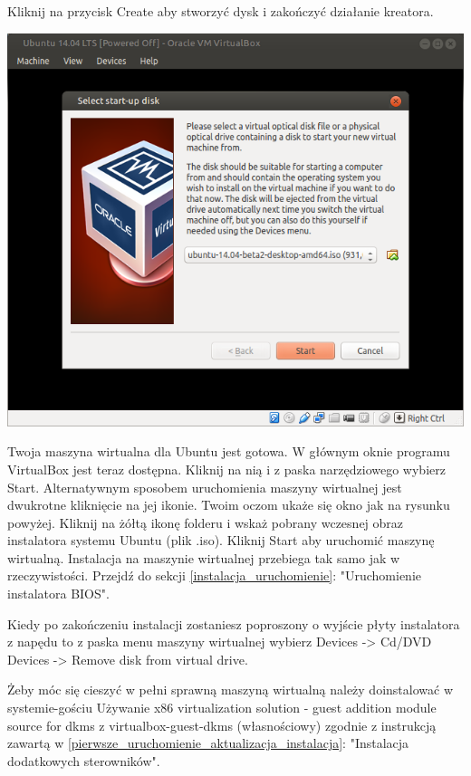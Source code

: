 Kliknij na przycisk \textcolor{ubuntu_orange}{Create} aby stworzyć dysk i zakończyć działanie kreatora.

\clearpage
\begin{center}
	\includegraphics[width=\linewidth]{images/virtualbox_start.png}
\end{center}

Twoja maszyna wirtualna dla Ubuntu jest gotowa. W głównym oknie programu VirtualBox jest teraz dostępna. Kliknij na nią i z paska narzędziowego wybierz \textcolor{ubuntu_orange}{Start}. Alternatywnym sposobem uruchomienia maszyny wirtualnej jest dwukrotne kliknięcie na jej ikonie. Twoim oczom ukaże się okno jak na rysunku powyżej. Kliknij na żółtą ikonę folderu i wskaż pobrany wczesnej obraz instalatora systemu Ubuntu (plik .iso). Kliknij \textcolor{ubuntu_orange}{Start} aby uruchomić maszynę wirtualną. Instalacja na maszynie wirtualnej przebiega tak samo jak w rzeczywistości. Przejdź do sekcji \ref{instalacja_uruchomienie}: "Uruchomienie instalatora BIOS".

Kiedy po zakończeniu instalacji zostaniesz poproszony o wyjście płyty instalatora z napędu to z paska menu maszyny wirtualnej wybierz \textcolor{ubuntu_orange}{Devices -> Cd/DVD Devices -> Remove disk from virtual drive}.

Żeby móc się cieszyć w pełni sprawną maszyną wirtualną należy doinstalować w systemie-gościu \textcolor{ubuntu_orange}{Używanie x86 virtualization solution - guest addition module source for dkms z virtualbox-guest-dkms (własnościowy)} zgodnie z instrukcją zawartą w \ref{pierwsze_uruchomienie_aktualizacja_instalacja}: "Instalacja dodatkowych sterowników".
\clearpage

